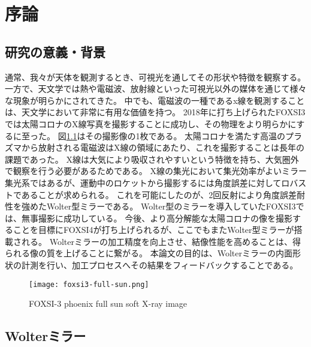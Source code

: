 \chapter{序論}
\thispagestyle{empty}
\label{chap1}
\graphicspath{{chap1/figure/}}
\minitoc


\newpage
\section{研究の意義・背景}
\label{chap1_background}

通常、我々が天体を観測するとき、可視光を通してその形状や特徴を観察する。
一方で、天文学では熱や電磁波、放射線といった可視光以外の媒体を通じて様々な現象が明らかにされてきた。
中でも、電磁波の一種であるx線を観測することは、天文学において非常に有用な価値を持つ。
2018年に打ち上げられたFOXSI3では太陽コロナのX線写真を撮影することに成功し、その物理をより明らかにするに至った。
図\ref{fig:foxsi-fullsun-image}はその撮影像の1枚である。
太陽コロナを満たす高温のプラズマから放射される電磁波はX線の領域にあたり、これを撮影することは長年の課題であった。
X線は大気により吸収されやすいという特徴を持ち、大気圏外で観察を行う必要があるためである。
X線の集光において集光効率がよいミラー集光系ではあるが、運動中のロケットから撮影するには角度誤差に対してロバストであることが求められる。
これを可能にしたのが、2回反射により角度誤差耐性を強めたWolter型ミラーである。
Wolter型のミラーを導入していたFOXSI3では、無事撮影に成功している。
今後、より高分解能な太陽コロナの像を撮影することを目標にFOXSI4が打ち上げられるが、ここでもまたWolter型ミラーが搭載される。
Wolterミラーの加工精度を向上させ、結像性能を高めることは、得られる像の質を上げることに繋がる。
本論文の目的は、Wolterミラーの内面形状の計測を行い、加工プロセスへその結果をフィードバックすることである。

\begin{figure}[h]
\centering
\texttt{[image: foxsi3-full-sun.png]}
\caption{FOXSI-3 phoenix full sun soft X-ray image}
\label{fig:foxsi-fullsun-image}
\end{figure}

\clearpage
\newpage

\section{Wolterミラー}
\label{chap1_wolter_mirror}

